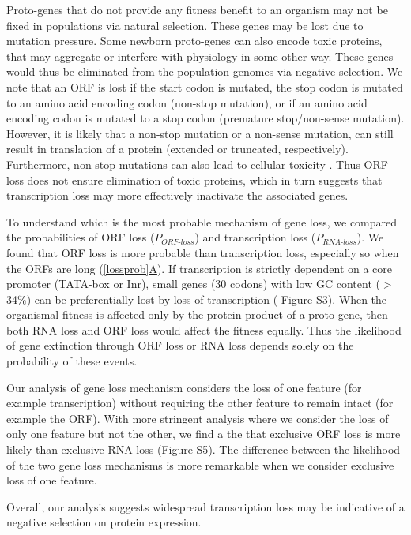 \documentclass[12pt,a4paper]{article}
\newcommand{\cmnt}[1]{{\color{purple} #1}}
\begin{document}
Proto-genes that do not provide any fitness benefit to an organism may not be fixed in populations via natural selection. These genes may be lost due to mutation pressure. Some newborn proto-genes can also encode toxic proteins, that may aggregate or interfere with physiology in some other way. These genes would thus be eliminated from the population genomes via negative selection. We note that an ORF is lost if the start codon is mutated, the stop codon is mutated to an amino acid encoding codon (non-stop mutation), or if an amino acid encoding codon is mutated to a stop codon (premature stop/non-sense mutation). However, it is likely that a non-stop mutation or a non-sense mutation, can still result in translation of a protein (extended or truncated, respectively). Furthermore, non-stop mutations can also lead to cellular toxicity \citep{nonstop}. Thus ORF loss does not ensure elimination of toxic proteins, which in turn suggests that transcription loss may more effectively inactivate the associated genes.

\cmnt{To understand which is the most probable mechanism of gene loss, we compared the probabilities of ORF loss ($P_\textit{ORF-loss}$) and transcription loss ($P_\textit{RNA-loss}$). We found that ORF loss is more probable than transcription loss, especially so when the ORFs are long (\hyperref[lossprob]{\autoref{lossprob}A}). If transcription is strictly dependent on a core promoter (TATA-box or Inr), small genes (30 codons) with low GC content ($>$34\%) can be preferentially lost by loss of transcription ({\color{blue} Figure S3}). When the organismal fitness is affected only by the protein product of a proto-gene, then both RNA loss and ORF loss would affect the fitness equally. Thus the likelihood of gene extinction through ORF loss or RNA loss depends solely on the probability of these events. 

Our analysis of gene loss mechanism considers the loss of one feature (for example transcription) without requiring the other feature to remain intact (for example the ORF). With more stringent analysis where we consider the loss of only one feature but not the other, we find a the that exclusive ORF loss is more likely than exclusive RNA loss ({\color{blue}Figure S5}). The difference between the likelihood of the two gene loss mechanisms is more remarkable when we consider exclusive loss of one feature.}

Overall, our analysis suggests widespread transcription loss may be indicative of a negative selection on protein expression.
\end{document}
